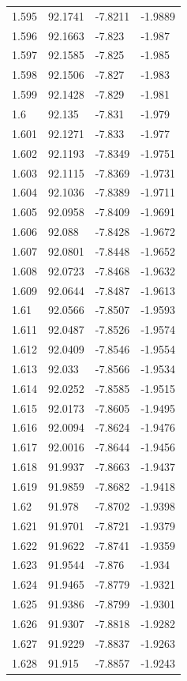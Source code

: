 \begin{tabular}{llll}
1.595 & 92.1741 & -7.8211 & -1.9889 \\
1.596 & 92.1663 & -7.823 & -1.987 \\
1.597 & 92.1585 & -7.825 & -1.985 \\
1.598 & 92.1506 & -7.827 & -1.983 \\
1.599 & 92.1428 & -7.829 & -1.981 \\
1.6 & 92.135 & -7.831 & -1.979 \\
1.601 & 92.1271 & -7.833 & -1.977 \\
1.602 & 92.1193 & -7.8349 & -1.9751 \\
1.603 & 92.1115 & -7.8369 & -1.9731 \\
1.604 & 92.1036 & -7.8389 & -1.9711 \\
1.605 & 92.0958 & -7.8409 & -1.9691 \\
1.606 & 92.088 & -7.8428 & -1.9672 \\
1.607 & 92.0801 & -7.8448 & -1.9652 \\
1.608 & 92.0723 & -7.8468 & -1.9632 \\
1.609 & 92.0644 & -7.8487 & -1.9613 \\
1.61 & 92.0566 & -7.8507 & -1.9593 \\
1.611 & 92.0487 & -7.8526 & -1.9574 \\
1.612 & 92.0409 & -7.8546 & -1.9554 \\
1.613 & 92.033 & -7.8566 & -1.9534 \\
1.614 & 92.0252 & -7.8585 & -1.9515 \\
1.615 & 92.0173 & -7.8605 & -1.9495 \\
1.616 & 92.0094 & -7.8624 & -1.9476 \\
1.617 & 92.0016 & -7.8644 & -1.9456 \\
1.618 & 91.9937 & -7.8663 & -1.9437 \\
1.619 & 91.9859 & -7.8682 & -1.9418 \\
1.62 & 91.978 & -7.8702 & -1.9398 \\
1.621 & 91.9701 & -7.8721 & -1.9379 \\
1.622 & 91.9622 & -7.8741 & -1.9359 \\
1.623 & 91.9544 & -7.876 & -1.934 \\
1.624 & 91.9465 & -7.8779 & -1.9321 \\
1.625 & 91.9386 & -7.8799 & -1.9301 \\
1.626 & 91.9307 & -7.8818 & -1.9282 \\
1.627 & 91.9229 & -7.8837 & -1.9263 \\
1.628 & 91.915 & -7.8857 & -1.9243 \\

\end{tabular}
